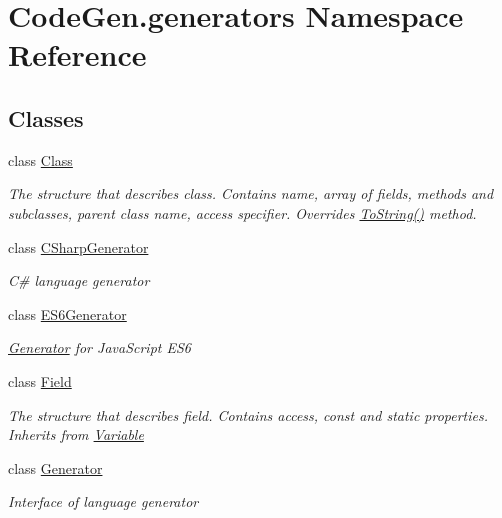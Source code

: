 \hypertarget{namespaceCodeGen_1_1generators}{}\section{Code\+Gen.\+generators Namespace Reference}
\label{namespaceCodeGen_1_1generators}
\subsection*{Classes}
\begin{DoxyCompactItemize}
\item 
class \mbox{\hyperlink{classCodeGen_1_1generators_1_1Class}{Class}}
\begin{DoxyCompactList}\small\item\em The structure that describes class. Contains name, array of fields, methods and subclasses, parent class name, access specifier. Overrides \mbox{\hyperlink{classCodeGen_1_1generators_1_1Class_a3d8c15ddeed8faad666f9dfdd53b758f}{To\+String()}} method. \end{DoxyCompactList}\item 
class \mbox{\hyperlink{classCodeGen_1_1generators_1_1CSharpGenerator}{C\+Sharp\+Generator}}
\begin{DoxyCompactList}\small\item\em C\# language generator \end{DoxyCompactList}\item 
class \mbox{\hyperlink{classCodeGen_1_1generators_1_1ES6Generator}{E\+S6\+Generator}}
\begin{DoxyCompactList}\small\item\em \mbox{\hyperlink{classCodeGen_1_1generators_1_1Generator}{Generator}} for Java\+Script E\+S6 \end{DoxyCompactList}\item 
class \mbox{\hyperlink{classCodeGen_1_1generators_1_1Field}{Field}}
\begin{DoxyCompactList}\small\item\em The structure that describes field. Contains access, const and static properties. Inherits from \mbox{\hyperlink{classCodeGen_1_1generators_1_1Variable}{Variable}} \end{DoxyCompactList}\item 
class \mbox{\hyperlink{classCodeGen_1_1generators_1_1Generator}{Generator}}
\begin{DoxyCompactList}\small\item\em Interface of language generator \end{DoxyCompactList}\item 

\end{DoxyCompactItemize}

